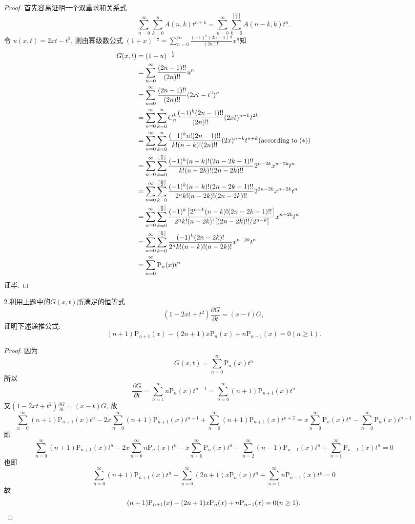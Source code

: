 \begin{proof} 
首先容易证明一个双重求和关系式
\begin{equation}
  \sum_{n=0}^{\infty}\sum_{k=0}^nA(n,k)t^{n+k}
  = \sum_{n=0}^{\infty}\sum_{k=0}^{[\frac{n}{2}]}A(n-k,k)t^n. \tag{$\star$}
\end{equation}
令 $u(x,t)=2xt-t^2$, 则由幂级数公式 
$(1+x)^{-\frac{1}{2}}=\sum_{n=0}^{\infty}\frac{(-1)^n(2n-1)!!}{(2n)!!}x^n$知
\[\begin{split}
G(x,t)&=(1-u)^{-\frac{1}{2}}\\
&=\sum_{n=0}^{\infty}\frac{(2n-1)!!}{(2n)!!}u^n\\
&=\sum_{n=0}^{\infty}\frac{(2n-1)!!}{(2n)!!}(2xt-t^2)^n\\
&=\sum_{n=0}^{\infty}\sum_{k=0}^nC_n^k\frac{(-1)^k(2n-1)!!}{(2n)!!}(2xt)^{n-k}t^{2k}\\
&=\sum_{n=0}^{\infty}\sum_{k=0}^n\frac{(-1)^kn!(2n-1)!!}{k!(n-k)!(2n)!!}(2x)^{n-k}t^{n+k}(\textrm{according\;to}\;(*))\\
&=\sum_{n=0}^{\infty}\sum_{k=0}^{[\frac{n}{2}]}\frac{(-1)^k(n-k)!(2n-2k-1)!!}{k!(n-2k)!(2n-2k)!!}2^{n-2k}x^{n-2k}t^n\\
&=\sum_{n=0}^{\infty}\sum_{k=0}^{[\frac{n}{2}]}\frac{(-1)^k(n-k)!(2n-2k-1)!!}{2^nk!(n-2k)!(2n-2k)!!}2^{2n-2k}x^{n-2k}t^n\\
&=\sum_{n=0}^{\infty}\sum_{k=0}^{[\frac{n}{2}]}\frac{(-1)^k\left[2^{n-k}(n-k)!(2n-2k-1)!!\right]}{2^nk!(n-2k)!\left[(2n-2k)!!/2^{n-k}\right]}x^{n-2k}t^n\\
&=\sum_{n=0}^{\infty}\sum_{k=0}^{[\frac{n}{2}]}\frac{(-1)^k(2n-2k)!}{2^nk!(n-k)!(n-2k)!}x^{n-2k}t^n\\
&=\sum_{n=0}^{\infty}\mathrm{P}_n(x)t^n
\end{split}\]
证毕.
\end{proof}


2.利用上题中的$G(x,t)$所满足的恒等式
\[(1-2xt+t^2)\frac{\partial G}{\partial t}=(x-t)G,\]
证明下述递推公式:
\[(n+1)\mathrm{P}_{n+1}(x)-(2n+1)x\mathrm{P}_n(x)+n\mathrm{P}_{n-1}(x)=0(n\geq1).\]

\begin{proof} 因为\[G(x,t)=\sum_{n=0}^{\infty}\mathrm{P}_n(x)t^n\]
所以\[\frac{\partial G}{\partial t}=\sum_{n=1}^{\infty}n\mathrm{P}_n(x)t^{n-1}=\sum_{n=0}^{\infty}(n+1)\mathrm{P}_{n+1}(x)t^n\]
又$(1-2xt+t^2)\frac{\partial G}{\partial t}=(x-t)G$, 故
\[\sum_{n=0}^{\infty}(n+1)\mathrm{P}_{n+1}(x)t^n-2x\sum_{n=0}^{\infty}(n+1)\mathrm{P}_{n+1}(x)t^{n+1}+\sum_{n=0}^{\infty}(n+1)\mathrm{P}_{n+1}(x)t^{n+2}=x\sum_{n=0}^{\infty}\mathrm{P}_n(x)t^n-\sum_{n=0}^{\infty}\mathrm{P}_n(x)t^{n+1}\]
即
\[\sum_{n=0}^{\infty}(n+1)\mathrm{P}_{n+1}(x)t^n-2x\sum_{n=0}^{\infty}n\mathrm{P}_n(x)t^n-x\sum_{n=0}^{\infty}\mathrm{P}_n(x)t^n+\sum_{n=2}^{\infty}(n-1)\mathrm{P}_{n-1}(x)t^n+\sum_{n=1}^{\infty}\mathrm{P}_{n-1}(x)t^n=0\]
也即
\[\sum_{n=0}^{\infty}(n+1)\mathrm{P}_{n+1}(x)t^n-\sum_{n=0}^{\infty}(2n+1)x\mathrm{P}_n(x)t^n+\sum_{n=1}^{\infty}n\mathrm{P}_{n-1}(x)t^n=0\]
故
\[(n+1)\mathrm{P}_{n+1}(x)-(2n+1)x\mathrm{P}_n(x)+n\mathrm{P}_{n-1}(x)=0(n\geq1).\qedhere\]
\end{proof}



